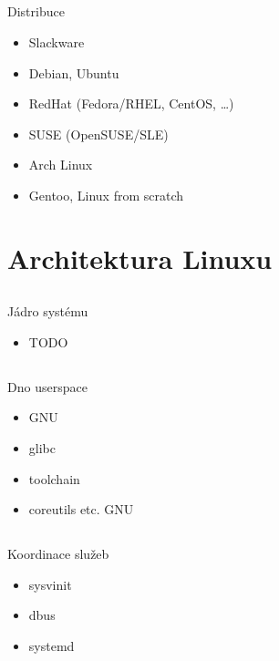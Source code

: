 \documentclass{beamer}
\begin{document}
\subsection{}
\begin{frame}{Distribuce}
\begin{itemize}
\item Slackware
\item Debian, Ubuntu
\item RedHat (Fedora/RHEL, CentOS, \dots)
\item SUSE (OpenSUSE/SLE)
\item Arch Linux
\item Gentoo, Linux from scratch
\end{itemize}
\end{frame}


\section{Architektura Linuxu}

\subsection{}
\begin{frame}{Jádro systému}
\begin{itemize}
\item TODO
\end{itemize}
\end{frame}

\subsection{}
\begin{frame}{Dno userspace}
\begin{itemize}
\item GNU
\item glibc
\item toolchain
\item coreutils etc. GNU
\end{itemize}
\end{frame}

\subsection{}
\begin{frame}{Koordinace služeb}
\begin{itemize}
\item sysvinit
\item dbus
\item systemd
\end{itemize}
\end{frame}
\end{document}

